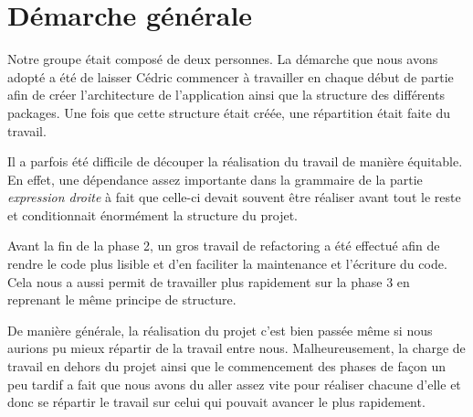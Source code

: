 \section{Démarche générale}


Notre groupe était composé de deux personnes. La démarche que nous avons adopté a été de laisser Cédric commencer à travailler en chaque début de partie afin de créer l'architecture de l'application ainsi que la structure des différents packages. Une fois que cette structure était créée, une répartition était faite du travail.
 
 Il a parfois été difficile de découper la réalisation du travail de manière équitable. En effet, une dépendance assez importante dans la grammaire de la partie \emph{expression droite} à fait que celle-ci devait souvent être réaliser avant tout le reste et conditionnait énormément la structure du projet.
 
 Avant la fin de la phase 2, un gros travail de refactoring a été effectué afin de rendre le code plus lisible et d'en faciliter la maintenance et l'écriture du code. Cela nous a aussi permit de travailler plus rapidement sur la phase 3 en reprenant le même principe de structure.
 
 De manière générale, la réalisation du projet c'est bien passée même si nous aurions pu mieux répartir de la travail entre nous. Malheureusement, la charge de travail en dehors du projet ainsi que le commencement des phases de façon un peu tardif a fait que nous avons du aller assez vite pour réaliser chacune d'elle et donc se répartir le travail sur celui qui pouvait avancer le plus rapidement.
 